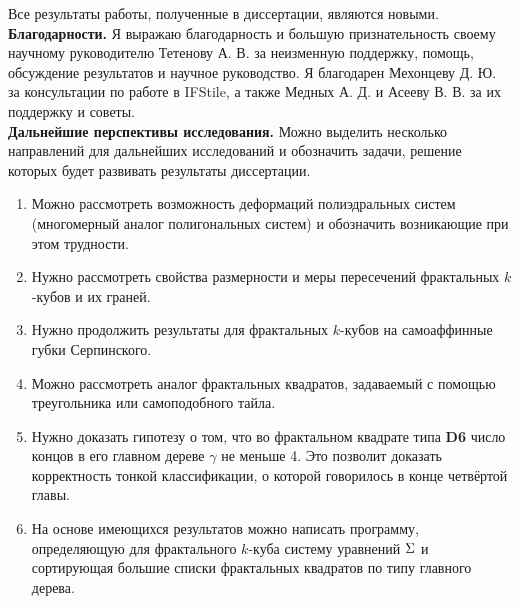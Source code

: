 Все результаты работы, полученные в диссертации, являются новыми.
\\

\textbf{Благодарности.}
Я выражаю благодарность и большую признательность своему научному руководителю Тетенову А. В. за неизменную поддержку, помощь, обсуждение результатов и научное руководство.
Я благодарен Мехонцеву Д. Ю.  за консультации по работе в IFStile, а также Медных А. Д. и Асееву В. В. за их поддержку и советы.\\


\textbf{Дальнейшие перспективы исследования.}
Можно выделить несколько направлений для дальнейших исследований и обозначить задачи, решение которых будет развивать результаты диссертации.
\begin{enumerate}
\item Можно рассмотреть возможность деформаций полиэдральных систем (многомерный аналог полигональных систем) и обозначить возникающие при этом трудности.
\item Нужно рассмотреть свойства размерности и меры пересечений фрактальных $k$-кубов и их граней.
\item Нужно продолжить результаты для фрактальных $k$-кубов на самоаффинные губки Серпинского.
\item Можно рассмотреть аналог фрактальных квадратов, задаваемый с помощью треугольника или самоподобного тайла.
\item Нужно доказать гипотезу о том, что во фрактальном квадрате типа {\bf D6} число концов в его главном дереве $\gamma$ не меньше 4. 
Это позволит доказать корректность тонкой классификации, о которой говорилось в конце четвёртой главы.
\item На основе имеющихся результатов можно написать программу, определяющую для фрактального $k$-куба систему уравнений $\Sigma$ и сортирующая большие списки фрактальных квадратов по типу главного дерева.
\end{enumerate}